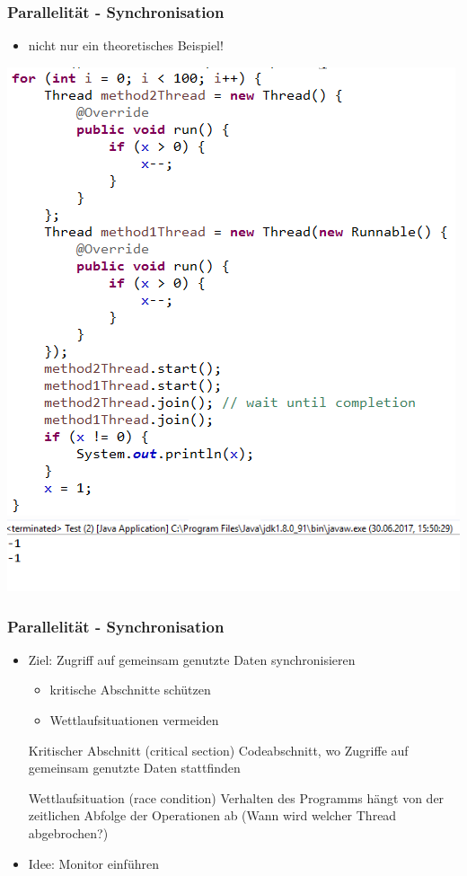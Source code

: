 \documentclass[18pt]{beamer}
\begin{document}
	\begin{frame}
		\frametitle{Parallelität - Synchronisation}
		\begin{itemize}
			\item nicht nur ein theoretisches Beispiel!
		\end{itemize}
		\centering
		\includegraphics[scale=0.43]{./pics/tut5/synch-ex.png} \pause
		\includegraphics[scale=0.43]{./pics/tut5/synch-ex2.png}
	\end{frame}

	\begin{frame}
		\frametitle{Parallelität - Synchronisation}
		\begin{itemize}
			\item Ziel: Zugriff auf gemeinsam genutzte Daten synchronisieren \pause 
			\begin{itemize}
				\item kritische Abschnitte schützen \pause
				\item Wettlaufsituationen vermeiden
			\end{itemize}
			\begin{block}{Kritischer Abschnitt (critical section)}
				Codeabschnitt, wo Zugriffe auf gemeinsam genutzte Daten stattfinden
			\end{block} \pause
			\begin{block}{Wettlaufsituation (race condition)}
				Verhalten des Programms hängt von der zeitlichen Abfolge der Operationen ab (Wann wird welcher Thread abgebrochen?)
			\end{block} \pause
			\item Idee: Monitor einführen
		\end{itemize}
	\end{frame}
\end{document}
